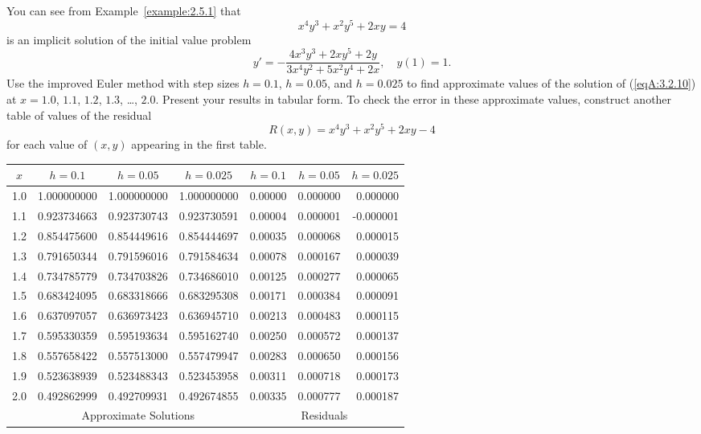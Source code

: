 \documentclass{ximera}
\begin{document}
\begin{problem}\label{exer:3.2.10} 
You can see from Example~\ref{example:2.5.1} that
$$
x^4y^3+x^2y^5+2xy=4
$$
is an implicit solution of  the initial value problem
\begin{equation}\label{eqA:3.2.10}
y'=-\frac{4x^3y^3+2xy^5+2y}{3x^4y^2+5x^2y^4+2x},\quad y(1)=1.
\end{equation}
Use the improved Euler method with step sizes $h=0.1$, $h=0.05$, and
$h=0.025$ to find approximate values of the solution of (\ref{eqA:3.2.10}) at
$x=1.0$, $1.1$, $1.2$, $1.3$, \dots, $2.0$. Present your results in
tabular form. To
check the error in these approximate values, construct another table
of values of the residual
$$
R(x,y)=x^4y^3+x^2y^5+2xy-4
$$
for each value of $(x,y)$ appearing in the first table.

\begin{solution}
    {\small
\begin{tabular}{|c|r|r|r|r|r|r|}\hline
\multicolumn{1}{|c|}{$x$}&
\multicolumn{1}{|c|}{$h=0.1$}&
\multicolumn{1}{|c|}{$h=0.05$}&
\multicolumn{1}{|c|}{$h=0.025$}&
\multicolumn{1}{|c|}{$h=0.1$}&
\multicolumn{1}{|c|}{$h=0.05$}&
\multicolumn{1}{|c|}{$h=0.025$}\\ \hline
1.0 & 1.000000000 & 1.000000000 & 1.000000000 &0.00000 & 0.000000 &  0.000000  \\
1.1 & 0.923734663 & 0.923730743 & 0.923730591 &0.00004 & 0.000001 & -0.000001  \\
1.2 & 0.854475600 & 0.854449616 & 0.854444697 &0.00035 & 0.000068 &  0.000015  \\
1.3 & 0.791650344 & 0.791596016 & 0.791584634 &0.00078 & 0.000167 &  0.000039  \\
1.4 & 0.734785779 & 0.734703826 & 0.734686010 &0.00125 & 0.000277 &  0.000065  \\
1.5 & 0.683424095 & 0.683318666 & 0.683295308 &0.00171 & 0.000384 &  0.000091  \\
1.6 & 0.637097057 & 0.636973423 & 0.636945710 &0.00213 & 0.000483 &  0.000115  \\
1.7 & 0.595330359 & 0.595193634 & 0.595162740 &0.00250 & 0.000572 &  0.000137  \\
1.8 & 0.557658422 & 0.557513000 & 0.557479947 &0.00283 & 0.000650 &  0.000156  \\
1.9 & 0.523638939 & 0.523488343 & 0.523453958 &0.00311 & 0.000718 &  0.000173  \\
2.0 & 0.492862999 & 0.492709931 & 0.492674855 &0.00335 & 0.000777 &  0.000187  \\
\hline
&\multicolumn{3}{c|}{Approximate Solutions}&
\multicolumn{3}{c|}{Residuals}\\\hline
\end{tabular}}
\end{solution}
\end{problem}
\end{document}
